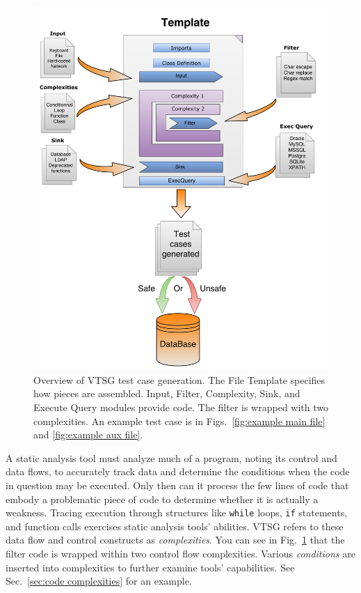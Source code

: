 \begin{figure}[tbp]
  \includegraphics[width=1\linewidth]{fig_VTSG_overview.png}
  \caption{Overview of VTSG test case generation.  The File Template specifies how
    pieces are assembled.  Input, Filter, Complexity, Sink, and Execute Query modules
    provide code.  The filter is wrapped with two complexities.
    An example test case is in
  Figs.~\ref{fig:example main file} and \ref{fig:example aux file}.}
  \label{fig:VTS operation overview}
\end{figure}

A static analysis tool must analyze much of a program, noting its control and
data flows, to accurately track data and determine the conditions when the code in
question may be executed.  Only then can it process the few lines of code that
embody a problematic piece of code to determine whether it is actually a weakness.
Tracing execution through structures like \verb|while|
loops, \verb|if| statements, and function calls exercises static analysis tools'
abilities.  VTSG refers to these data flow and control constructs as
\emph{complexities}.  You can see in Fig.~\ref{fig:VTS operation overview} that the
filter code is wrapped within two control flow complexities.  Various
\emph{conditions} are inserted into complexities to further examine tools'
capabilities.  See Sec.~\ref{sec:code complexities} for an example.

